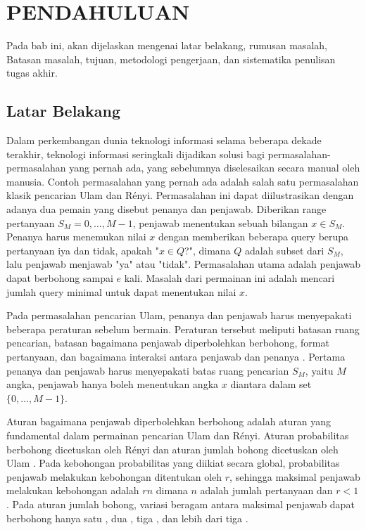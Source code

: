 \vspace{0ex}
\chapter {PENDAHULUAN}
Pada bab ini, akan dijelaskan mengenai latar belakang, rumusan masalah, Batasan masalah, tujuan, metodologi pengerjaan, dan sistematika penulisan tugas akhir.

\section{Latar Belakang}
\par Dalam perkembangan dunia teknologi informasi selama beberapa dekade terakhir, teknologi informasi seringkali dijadikan solusi bagi permasalahan-permasalahan yang pernah ada, yang sebelumnya diselesaikan secara manual oleh manusia. Contoh permasalahan yang pernah ada adalah salah satu permasalahan klasik pencarian Ulam dan Rényi. Permasalahan ini dapat diilustrasikan dengan adanya dua pemain yang disebut penanya dan penjawab. Diberikan range pertanyaan $S_M = {0,\ldots,M-1}$, penjawab menentukan sebuah bilangan $x \in S_M$. Penanya harus menemukan nilai $x$ dengan memberikan beberapa query berupa pertanyaan iya dan tidak, apakah "$x \in Q$?", dimana $Q$ adalah subset dari $S_M$, lalu penjawab menjawab "ya" atau "tidak". Permasalahan utama adalah penjawab dapat berbohong sampai $e$ kali. Masalah dari permainan ini adalah mencari jumlah query minimal untuk dapat menentukan nilai $x$.

Pada permasalahan pencarian Ulam, penanya dan penjawab harus menyepakati beberapa peraturan sebelum bermain. Peraturan tersebut meliputi batasan ruang pencarian, batasan bagaimana penjawab diperbolehkan berbohong, format pertanyaan, dan bagaimana interaksi antara penjawab dan penanya \cite{Pelc2002}. Pertama penanya dan penjawab harus menyepakati batas ruang pencarian $S_M$, yaitu $M$ angka, penjawab hanya boleh menentukan angka $x$ diantara dalam set $\{0,\ldots,M-1\}$.

Aturan bagaimana penjawab diperbolehkan berbohong adalah aturan yang fundamental dalam permainan pencarian Ulam dan Rényi. Aturan probabilitas berbohong dicetuskan oleh Rényi dan aturan jumlah bohong dicetuskan oleh Ulam \cite{StanislawMUlam1976}. Pada kebohongan probabilitas yang diikiat secara global, probabilitas penjawab melakukan kebohongan ditentukan oleh $r$, sehingga maksimal penjawab melakukan kebohongan adalah $rn$ dimana $n$ adalah jumlah pertanyaan dan $r<1$ \cite{Dhagat1999}. Pada aturan jumlah bohong, variasi beragam antara maksimal penjawab dapat berbohong hanya satu \cite{Ellis2008} \cite{Pelc1988}, dua \cite{Cicalese2000}, tiga \cite{Negro1992}, dan lebih dari tiga \cite{Berlekamp1998} \cite{Deppe2004}.

